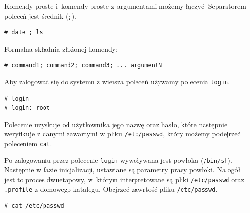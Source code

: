 \begin{example}\label{ex:prostakomenda3}

Komendy proste i~komendy proste z~argumentami możemy łączyć. Separatorem poleceń jest średnik (\lstinline[style=MyBashStyle]{;}).


\begin{lstlisting}[style=MyBashStyle]
# date ; ls
\end{lstlisting}

Formalna składnia złożonej komendy:

\begin{lstlisting}[style=MyBashStyle]
# command1; command2; command3; ... argumentN
\end{lstlisting}
\end{example}

\begin{example}\label{ex:prostakomenda4}


Aby zalogować się do systemu z wiersza poleceń używamy polecenia \lstinline[style=MyBashStyle]{login}.

\begin{lstlisting}[style=MyBashStyle]
# login
# login: root
\end{lstlisting}

Polecenie uzyskuje od użytkownika jego nazwę oraz hasło, które następnie weryfikuje z danymi zawartymi w pliku \lstinline[style=MyBashStyle]{/etc/passwd}, który możemy podejrzeć poleceniem \lstinline[style=MyBashStyle]{cat}.
\end{example}


\begin{example}\label{ex:prostakomenda5}


Po zalogowaniu przez polecenie \lstinline[style=MyBashStyle]{login} wywoływana jest powłoka (\lstinline[style=MyBashStyle]{/bin/sh}). Następnie w fazie inicjalizacji, ustawiane są parametry pracy powłoki. Na ogół jest to proces dwuetapowy, w~którym interpretowane są pliki \lstinline[style=MyBashStyle]{/etc/passwd} oraz \lstinline[style=MyBashStyle]{.profile} z domowego katalogu. Obejrzeć zawrtość pliku \lstinline[style=MyBashStyle]{/etc/passwd}.

\begin{lstlisting}[style=MyBashStyle]
# cat /etc/passwd
\end{lstlisting}
\end{example}

